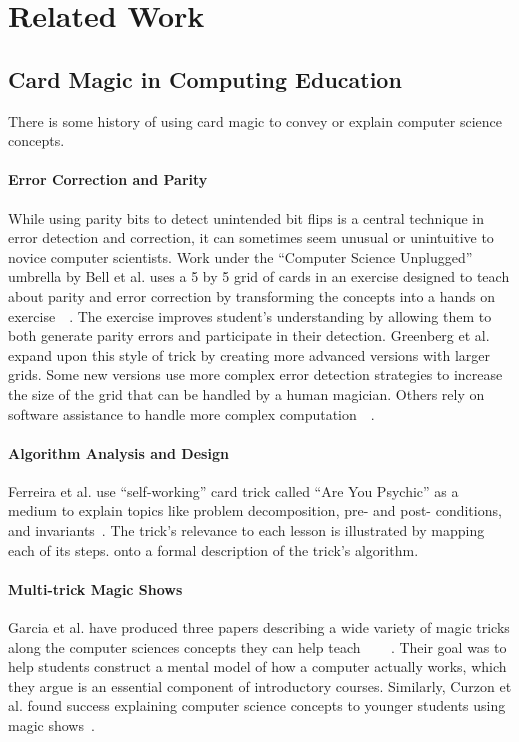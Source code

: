 \section{Related Work}
\label{SEC:related-work}

\subsection{Card Magic in Computing Education}
There is some history of using card magic to convey or explain computer science
concepts.

\paragraph{Error Correction and Parity}
While using parity bits to detect unintended bit flips is a central technique
in error detection and correction, it can sometimes seem unusual or unintuitive
to novice computer scientists.
Work under the ``Computer Science Unplugged'' umbrella by Bell et al. uses
a 5 by 5 grid of cards in an exercise designed to teach about parity and
error correction by transforming the concepts into a hands on
exercise~\cite{bell2009computer}~\cite{csunplugged}.  The exercise improves
student's understanding by allowing them to both generate parity errors and
participate in their detection.
Greenberg et al. expand upon this style of trick by creating more advanced
versions with larger grids.  Some new versions use more complex error detection
strategies to increase the size of the grid that can be handled by a human
magician.  Others rely on software assistance to handle more complex
computation~\cite{Greenberg2017}~\cite{Greenberg2018}.

\paragraph{Algorithm Analysis and Design}
Ferreira et al. use ``self-working'' card trick called ``Are You Psychic''
as a medium to explain topics
like problem decomposition, pre- and post- conditions, and
invariants~\cite{ferreira2014magic}.
The trick's relevance to each lesson is illustrated by
mapping each of its steps.
onto a formal description of the trick's algorithm.

\paragraph{Multi-trick Magic Shows}
Garcia et al. have produced three papers describing a wide variety of magic
tricks along the computer sciences concepts they can help
teach~\cite{garcia2012demystifying}
~\cite{garcia2013demystifying}
~\cite{garcia2016demystifying}.
Their goal was to help students construct a mental model of how a computer
actually works, which they argue is an essential component of introductory
courses.
Similarly, Curzon et al. found success explaining computer
science concepts to younger students using magic shows~\cite{Curzon2008}.

